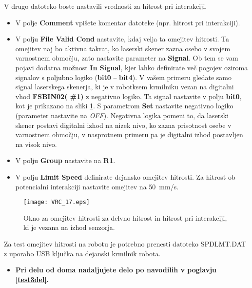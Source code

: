 V drugo datoteko boste nastavili vrednosti za hitrost pri interakciji.

\begin{itemize}
	\item V polje \textbf{Comment} vpišete komentar datoteke (npr. hitrost pri interakciji).
	\item V polju \textbf{{File Valid Cond}} nastavite, kdaj velja ta omejitev hitrosti. Ta  omejitev naj bo aktivna takrat, ko laserski skener zazna osebo v svojem varnostnem območju, zato nastavite parameter na \textbf{Signal}. Ob tem se vam pojavi dodatna možnost \textbf{In Signal}, kjer lahko definirate več pogojev oziroma signalov s poljubno logiko (\textbf{bit0} -- \textbf{bit4}). V vašem primeru gledate samo signal laserskega skenerja, ki je v robotksem krmilniku vezan na digitalni vhod  \textbf{FSBIN02( \#1)} z negativno logiko. Ta signal nastavite v polju \textbf{bit0}, kot je prikazano na sliki \ref{fig:VRC_17}. S parametrom \textbf{Set} nastavite negativno logiko (parameter nastavite na \emph{OFF}). Negativna logika pomeni to, da laserski skener postavi digitalni izhod na nizek nivo, ko zazna prisotnost osebe v varnostnem območju, v nasprotnem primeru pa je digitalni izhod postavljen na visok nivo.
	\item V polju \textbf{Group} nastavite na \textbf{R1}.
	\item V polju \textbf{Limit Speed} definirate dejansko omejitev hitrosti. Za hitrost ob potencialni interakciji nastavite omejitev na 50~mm/s.
\end{itemize}

\begin{figure}[hbt]
	\centering
	\texttt{[image: VRC\_17.eps]}
	\caption{Okno za omejitev hitrosti za delvno hitrost in hitrost pri interakciji, ki je vezana na izhod senzorja.}
	\label{fig:VRC_17}
\end{figure}

Za test omejitev hitrosti na robotu je potrebno prenesti datoteko SPDLMT.DAT z uporabo USB ključka na dejanski krmilnik robota.

\begin{mdframed}[backgroundcolor=red!20, shadow=true,roundcorner=8pt]
	\begin{itemize}
		\item \textbf{Pri delu od doma nadaljujete delo po navodilih v poglavju \ref{test3del}.}		
	\end{itemize}
\end{mdframed}

